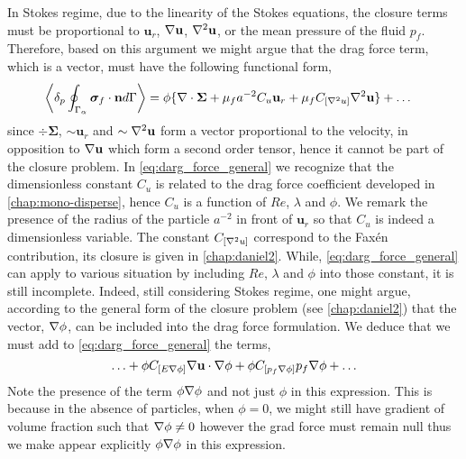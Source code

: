 In Stokes regime, due to the linearity of the Stokes equations, the closure terms must be proportional to $\textbf{u}_{r}$, $\mathbf{\nabla} \textbf{u}$, $\mathbf{\nabla}^2 \textbf{u}$, or the mean pressure of the fluid $p_f$. 
Therefore, based on this argument we might argue that the drag force term, which is a vector, must have the following functional form, 
\begin{align}
    \pSavg{\bm\sigma_f\cdot \textbf{n}} &= 
    \phi \{
    \div \bm\Sigma
    + 
    \mu_f a^{-2}
    C_u \textbf{u}_{r}
    +\mu_f C_{[\grad^2 u]} \grad^2 \textbf{u}
    \} + \ldots
    \label{eq:darg_force_general}
\end{align}
since $\div \bm\Sigma$, $\sim \textbf{u}_r$ and  $\sim \mathbf{\nabla}^2 \textbf{u}$ form a vector proportional to the velocity, in opposition to $\mathbf{\nabla} \textbf{u}$ which form a second order tensor, hence it cannot be part of the closure problem. 
In \ref{eq:darg_force_general} we recognize that the dimensionless constant $C_u$ is related to the drag force coefficient developed in \ref{chap:mono-disperse}, hence $C_u$ is a function of $Re$, $\lambda$ and $\phi$.
We remark the presence of the radius of the particle $a^{-2}$ in front of $\textbf{u}_r$ so that $C_u$ is indeed a dimensionless variable. 
The constant $C_{[\mathbf{\nabla}^2 u]}$ correspond to the Fax\'en contribution, its closure is given in \ref{chap:daniel2}.
While, \ref{eq:darg_force_general} can apply to various situation by including $Re$, $\lambda$ and $\phi$ into those constant, it is still incomplete. 
Indeed, still considering Stokes regime, one might argue, according to the general form of the closure problem (see \ref{chap:daniel2}) that the vector, $\mathbf{\nabla} \phi$, can be included into the drag force formulation. 
We deduce that we must add to \ref{eq:darg_force_general} the terms, 
\begin{equation}
    \ldots 
    +
    \phi C_{[E \grad\phi ]} \grad \textbf{u} \cdot \grad \phi 
    + \phi C_{[p_f \grad\phi ]} p_f \grad \phi 
    + \ldots
    \label{eq:drag_inhomo}
\end{equation}
Note the presence of the term $\phi \mathbf{\nabla} \phi$ and not just $\phi$ in this expression. 
This is because in the absence of particles, when $\phi=0$, we might still have gradient of volume fraction such that $\mathbf{\nabla} \phi \neq 0$ however the grad force must remain null thus we make appear explicitly $\phi\mathbf{\nabla}\phi$ in this expression. 
